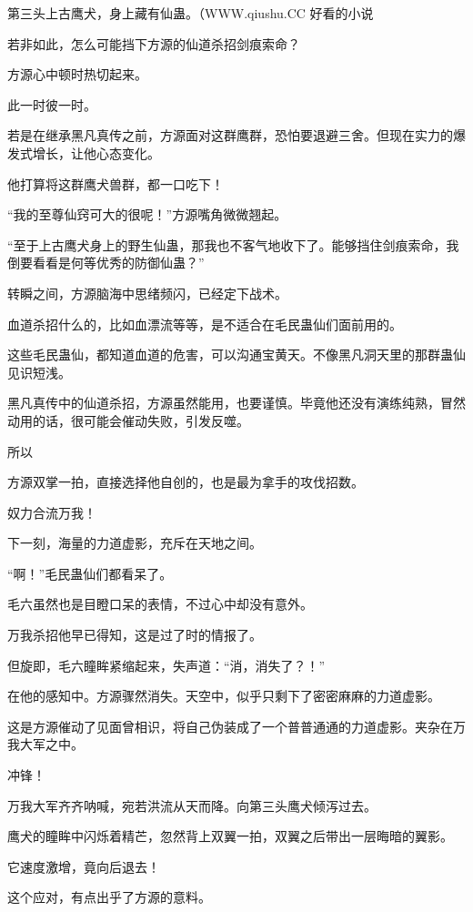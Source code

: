 
\begin{this_body}

第三头上古鹰犬，身上藏有仙蛊。（WWW.qiushu.CC 好看的小说

若非如此，怎么可能挡下方源的仙道杀招剑痕索命？

方源心中顿时热切起来。

此一时彼一时。

若是在继承黑凡真传之前，方源面对这群鹰群，恐怕要退避三舍。但现在实力的爆发式增长，让他心态变化。

他打算将这群鹰犬兽群，都一口吃下！

“我的至尊仙窍可大的很呢！”方源嘴角微微翘起。

“至于上古鹰犬身上的野生仙蛊，那我也不客气地收下了。能够挡住剑痕索命，我倒要看看是何等优秀的防御仙蛊？”

转瞬之间，方源脑海中思绪频闪，已经定下战术。

血道杀招什么的，比如血漂流等等，是不适合在毛民蛊仙们面前用的。

这些毛民蛊仙，都知道血道的危害，可以沟通宝黄天。不像黑凡洞天里的那群蛊仙见识短浅。

黑凡真传中的仙道杀招，方源虽然能用，也要谨慎。毕竟他还没有演练纯熟，冒然动用的话，很可能会催动失败，引发反噬。

所以

方源双掌一拍，直接选择他自创的，也是最为拿手的攻伐招数。

奴力合流万我！

下一刻，海量的力道虚影，充斥在天地之间。

“啊！”毛民蛊仙们都看呆了。

毛六虽然也是目瞪口呆的表情，不过心中却没有意外。

万我杀招他早已得知，这是过了时的情报了。

但旋即，毛六瞳眸紧缩起来，失声道：“消，消失了？！”

在他的感知中。方源骤然消失。天空中，似乎只剩下了密密麻麻的力道虚影。

这是方源催动了见面曾相识，将自己伪装成了一个普普通通的力道虚影。夹杂在万我大军之中。

冲锋！

万我大军齐齐呐喊，宛若洪流从天而降。向第三头鹰犬倾泻过去。

鹰犬的瞳眸中闪烁着精芒，忽然背上双翼一拍，双翼之后带出一层晦暗的翼影。

它速度激增，竟向后退去！

这个应对，有点出乎了方源的意料。


\end{this_body}
